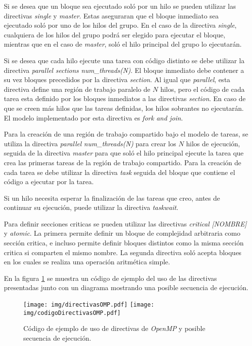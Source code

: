 Si se desea que un bloque sea ejecutado soló por un hilo se pueden utilizar las
directivas \emph{single} y \emph{master}. Estas aseguraran que el bloque
inmediato sea ejecutado soló por uno de los hilos del grupo. En el caso de la
directiva \emph{single}, cualquiera de los hilos del grupo podrá ser elegido
para ejecutar el bloque, mientras que en el caso de \emph{master}, soló el
hilo principal del grupo lo ejecutarán.

Si se desea que cada hilo ejecute una tarea con código distinto se debe utilizar
la directiva \emph{parallel sections num\_threads(N)}. El bloque inmediato debe
contener a su vez bloques precedidos por la directiva \emph{section}. Al igual
que \emph{parallel}, esta directiva define una región de trabajo paralelo de $N$
hilos, pero el código de cada tarea esta definido por los bloques inmediatos a
las directivas \emph{section}. En caso de que se creen más hilos que las tareas
definidas, los hilos sobrantes no ejecutarán. El modelo implementado por esta
directiva es \emph{fork and join}.

Para la creación de una región de trabajo compartido bajo el modelo de tareas, se
utiliza la directiva \emph{parallel num\_threads(N)} para crear los $N$ hilos de
ejecución, seguida de la directiva \emph{master} para que soló el hilo principal
ejecute la tarea que crea las primeras tareas de la región de trabajo
compartido. Para la creación de cada tarea se debe utilizar la directiva
\emph{task} seguida del bloque que contiene el código a ejecutar por la tarea.

Si un hilo necesita esperar la finalización de las tareas que creo, antes de
continuar su ejecución, puede utilizar la directiva \emph{taskwait}.

Para definir secciones criticas se pueden utilizar las directivas \emph{critical
[NOMBRE]} y \emph{atomic}. La primera permite definir un bloque de complejidad
arbitraria como sección critica, e incluso permite definir bloques distintos
como la misma sección critica si comparten el mismo nombre. La segunda directiva
soló acepta bloques en los cuales se realiza una operación aritmética simple.

En la figura \ref{directivas} se muestra un código de ejemplo del uso de las
directivas presentadas junto con un diagrama mostrando una posible secuencia
de ejecución.

\begin{figure}[h]

	\centering

	\texttt{[image: img/directivasOMP.pdf]}
	\texttt{[image: img/codigoDirectivasOMP.pdf]}

	\caption{Código de ejemplo de uso de directivas de \emph{OpenMP} y
	posible secuencia de ejecución.}

	\label{directivas}

\end{figure}
